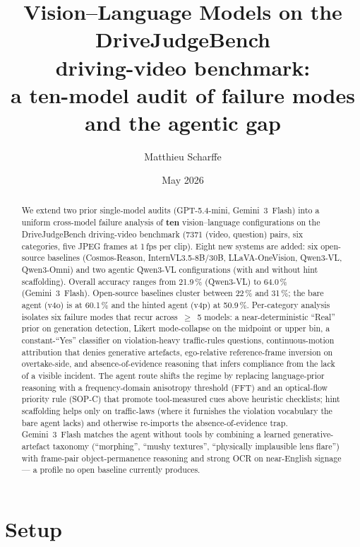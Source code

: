 \documentclass[11pt,a4paper]{article}
\title{Vision--Language Models on the DriveJudgeBench\\driving-video benchmark:\\
a ten-model audit of failure modes\\and the agentic gap}
\author{Matthieu Scharffe}
\date{May 2026}
\providecommand{\num}[1]{#1}
\newcommand{\pct}[1]{#1\,\%}
\begin{document}
\maketitle

\begin{abstract}
We extend two prior single-model audits (GPT-5.4-mini, Gemini~3~Flash) into
a uniform cross-model failure analysis of \textbf{ten} vision--language
configurations on the DriveJudgeBench driving-video benchmark
(\num{7371} (video, question) pairs, six categories, five JPEG frames at
1\,fps per clip). Eight new systems are added: six open-source baselines
(Cosmos-Reason, InternVL3.5-8B/30B, LLaVA-OneVision, Qwen3-VL,
Qwen3-Omni) and two agentic Qwen3-VL configurations (with and without
hint scaffolding). Overall accuracy ranges from \pct{21.9} (Qwen3-VL) to
\pct{64.0} (Gemini~3~Flash). Open-source baselines cluster between
\pct{22} and \pct{31}; the bare agent (v4o) is at \pct{60.1} and the
hinted agent (v4p) at \pct{50.9}. Per-category analysis isolates six
failure modes that recur across~$\geq$~5 models: a near-deterministic
``Real'' prior on generation detection, Likert mode-collapse on the
midpoint or upper bin, a constant-``Yes'' classifier on
violation-heavy traffic-rules questions, continuous-motion attribution
that denies generative artefacts, ego-relative reference-frame
inversion on overtake-side, and absence-of-evidence reasoning that
infers compliance from the lack of a visible incident. The agent route
shifts the regime by replacing language-prior reasoning with a
frequency-domain anisotropy threshold (FFT) and an optical-flow priority
rule (SOP-C) that promote tool-measured cues above heuristic checklists;
hint scaffolding helps only on traffic-laws (where it furnishes the
violation vocabulary the bare agent lacks) and otherwise re-imports the
absence-of-evidence trap. Gemini~3~Flash matches the agent without
tools by combining a learned generative-artefact taxonomy
(``morphing'', ``mushy textures'', ``physically implausible lens
flare'') with frame-pair object-permanence reasoning and strong OCR on
near-English signage --- a profile no open baseline currently produces.
\end{abstract}

\section{Setup}
\label{sec:setup}
\end{document}
